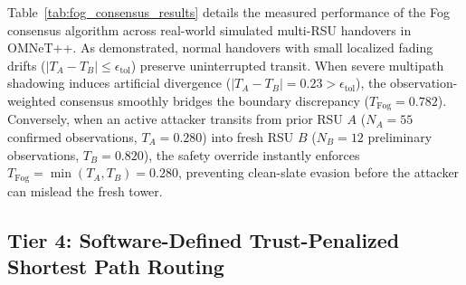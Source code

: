 \documentclass[conference]{IEEEtran}
\begin{document}
Table~\ref{tab:fog_consensus_results} details the measured performance of the Fog consensus algorithm across real-world simulated multi-RSU handovers in OMNeT++. As demonstrated, normal handovers with small localized fading drifts ($|T_A - T_B| \le \epsilon_{\text{tol}}$) preserve uninterrupted transit. When severe multipath shadowing induces artificial divergence ($|T_A - T_B| = 0.23 > \epsilon_{\text{tol}}$), the observation-weighted consensus smoothly bridges the boundary discrepancy ($T_{\text{Fog}} = 0.782$). Conversely, when an active attacker transits from prior RSU $A$ ($N_A = 55$ confirmed observations, $T_A = 0.280$) into fresh RSU $B$ ($N_B = 12$ preliminary observations, $T_B = 0.820$), the safety override instantly enforces $T_{\text{Fog}} = \min(T_A, T_B) = 0.280$, preventing clean-slate evasion before the attacker can mislead the fresh tower.

\begin{table}[htbp]
\centering
\caption{Regional Fog Trust-Consensus Evaluation Under Multi-RSU Handovers}
\label{tab:fog_consensus_results}
\end{table}

\subsection{Tier 4: Software-Defined Trust-Penalized Shortest Path Routing}
\end{document}
